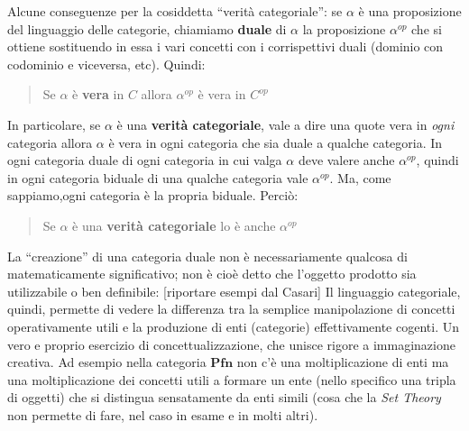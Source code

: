 \documentclass[a4paper, 11pt]{article}
\begin{document}
Alcune conseguenze per la cosiddetta ``verità categoriale'': se $\alpha$ è una proposizione del linguaggio delle categorie, chiamiamo \textbf{duale} di $\alpha$ la proposizione $\alpha^{op}$ che si ottiene sostituendo in essa i vari concetti con i corrispettivi duali (dominio con codominio e viceversa, etc). Quindi:
\begin{quote}
	Se $\alpha$ è \textbf{vera} in $C$ allora $\alpha^{op}$ è vera in $C^{op}$
\end{quote}
In particolare, se $\alpha$ è una \textbf{verità categoriale}, vale a dire una quote vera in \textit{ogni} categoria allora $\alpha$ è vera in ogni categoria che sia duale a qualche categoria. In ogni categoria duale di ogni categoria in cui valga $\alpha$ deve valere anche $\alpha^{op}$, quindi in ogni categoria biduale di una qualche categoria vale $\alpha^{op}$. Ma, come sappiamo,ogni categoria è la propria biduale. Perciò:
\begin{quote}
	Se $\alpha$ è una \textbf{verità categoriale} lo è anche $\alpha^{op}$
\end{quote}
La ``creazione'' di una categoria duale non è necessariamente qualcosa di matematicamente significativo; non è cioè detto che l'oggetto prodotto sia utilizzabile o ben definibile: [riportare esempi dal Casari]
Il linguaggio categoriale, quindi, permette di vedere la differenza tra la semplice manipolazione di concetti operativamente utili e la produzione di enti (categorie) effettivamente cogenti. Un vero e proprio esercizio di concettualizzazione, che unisce rigore a immaginazione creativa. Ad esempio nella categoria $\textbf{Pfn}$ non c'è una moltiplicazione di enti ma una moltiplicazione dei concetti utili a formare un ente (nello specifico una tripla di oggetti) che si distingua sensatamente da enti simili (cosa che la \textit{Set Theory} non permette di fare, nel caso in esame e in molti altri).
\end{document}
